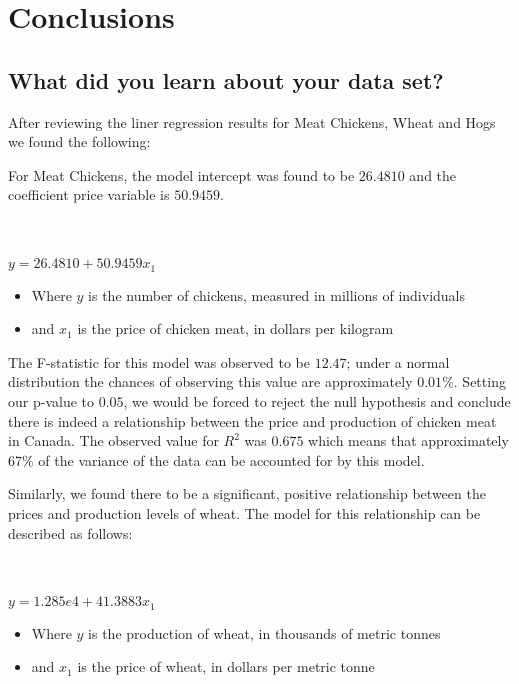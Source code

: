 \section{Conclusions}

\subsection{What did you learn about your data set?}


After reviewing the liner regression results for Meat Chickens, Wheat and Hogs we found the following:

For Meat Chickens, the model intercept was found to be $26.4810$ and the coefficient price variable is $50.9459$.

\\~\\

\tabto{5cm} $y = 26.4810 + 50.9459x_1$

\begin{itemize}
    \item Where $y$ is the number of chickens, measured in millions of individuals
    \item and $x_1$ is the price of chicken meat, in dollars per kilogram
\end{itemize}

The F-statistic for this model was observed to be $12.47$; under a normal distribution the chances of observing this value are approximately $0.01\%$.
Setting our p-value to $0.05$, we would be forced to reject the null hypothesis and conclude there is indeed a relationship between the price and production of chicken meat in Canada.
The observed value for $R^2$ was $0.675$ which means that approximately 67\% of the variance of the data can be accounted for by this model.

Similarly, we found there to be a significant, positive relationship between the prices and production levels of wheat.
The model for this relationship can be described as follows:

\\~\\

\tabto{5cm} $y = 1.285e4 + 41.3883x_1$

\begin{itemize}
    \item Where $y$ is the production of wheat, in thousands of metric tonnes
    \item and $x_1$ is the price of wheat, in dollars per metric tonne
\end{itemize}

